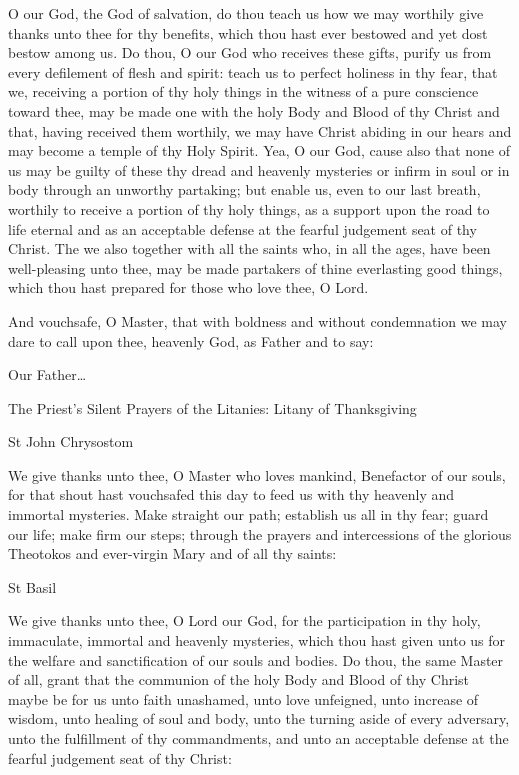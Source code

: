 \documentclass[
]{article}
\begin{document}
O our God, the God of salvation, do thou teach us how we may worthily
give thanks unto thee for thy benefits, which thou hast ever bestowed
and yet dost bestow among us. Do thou, O our God who receives these
gifts, purify us from every defilement of flesh and spirit: teach us to
perfect holiness in thy fear, that we, receiving a portion of thy holy
things in the witness of a pure conscience toward thee, may be made one
with the holy Body and Blood of thy Christ and that, having received
them worthily, we may have Christ abiding in our hears and may become a
temple of thy Holy Spirit. Yea, O our God, cause also that none of us
may be guilty of these thy dread and heavenly mysteries or infirm in
soul or in body through an unworthy partaking; but enable us, even to
our last breath, worthily to receive a portion of thy holy things, as a
support upon the road to life eternal and as an acceptable defense at
the fearful judgement seat of thy Christ. The we also together with all
the saints who, in all the ages, have been well-pleasing unto thee, may
be made partakers of thine everlasting good things, which thou hast
prepared for those who love thee, O Lord.

And vouchsafe, O Master, that with boldness and without condemnation we
may dare to call upon thee, heavenly God, as Father and to say:

Our Father\ldots{}

The Priest's Silent Prayers of the Litanies: Litany of Thanksgiving

St John Chrysostom

We give thanks unto thee, O Master who loves mankind, Benefactor of our
souls, for that shout hast vouchsafed this day to feed us with thy
heavenly and immortal mysteries. Make straight our path; establish us
all in thy fear; guard our life; make firm our steps; through the
prayers and intercessions of the glorious Theotokos and ever-virgin Mary
and of all thy saints:

St Basil

We give thanks unto thee, O Lord our God, for the participation in thy
holy, immaculate, immortal and heavenly mysteries, which thou hast given
unto us for the welfare and sanctification of our souls and bodies. Do
thou, the same Master of all, grant that the communion of the holy Body
and Blood of thy Christ maybe be for us unto faith unashamed, unto love
unfeigned, unto increase of wisdom, unto healing of soul and body, unto
the turning aside of every adversary, unto the fulfillment of thy
commandments, and unto an acceptable defense at the fearful judgement
seat of thy Christ:
\end{document}
